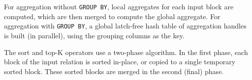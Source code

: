 For aggregation without \texttt{GROUP BY}, local aggregates for each input block are computed, which are then merged to compute the global aggregate.
For aggregation with \texttt{GROUP BY}, a global latch-free hash table of aggregation handles is built (in parallel), using the grouping columns as the key.

The sort and top-K operators use a two-phase algorithm. %
In the first phase, each block of the input relation is sorted in-place, or copied to a single temporary sorted block. 
These sorted blocks are merged in the second (final) phase.






